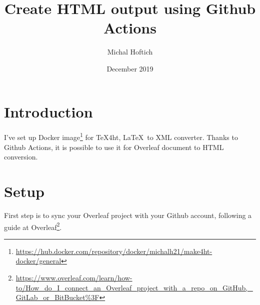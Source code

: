 \documentclass{article}
\title{Create HTML output using Github Actions}
\author{Michal Hoftich}
\date{December 2019}
\newcommand\footurl[1]{\footnote{\url{#1}}}
\begin{document}
\maketitle

\section{Introduction}

I've set up Docker image\footurl{https://hub.docker.com/repository/docker/michalh21/make4ht-docker/general} for TeX4ht, \LaTeX\ to XML converter. Thanks to Github Actions, it is possible to use it for Overleaf document to HTML conversion.

\section{Setup}

First step is to sync your Overleaf project with your Github account, following a guide at Overleaf\footurl{https://www.overleaf.com/learn/how-to/How_do_I_connect_an_Overleaf_project_with_a_repo_on_GitHub,_GitLab_or_BitBucket\%3F}. 
\end{document}
